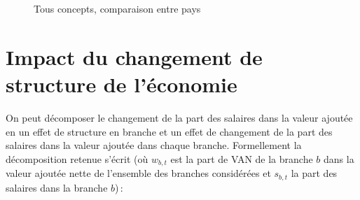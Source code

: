 \documentclass[
  french,
  9pt,
  a4paper,
]{article}
\begin{document}
\begin{figure}[H]

\caption{\label{fig-psalcompote}Tous concepts, comparaison entre pays}


\end{figure}%

\section{Impact du changement de structure de
l'économie}\label{impact-du-changement-de-structure-de-luxe9conomie}

On peut décomposer le changement de la part des salaires dans la valeur
ajoutée en un effet de structure en branche et un effet de changement de
la part des salaires dans la valeur ajoutée dans chaque branche.
Formellement la décomposition retenue s'écrit (où \(w_{b,t}\) est la
part de VAN de la branche \(b\) dans la valeur ajoutée nette de
l'ensemble des branches considérées et \(s_{b,t}\) la part des salaires
dans la branche \(b\))\,:
\end{document}

